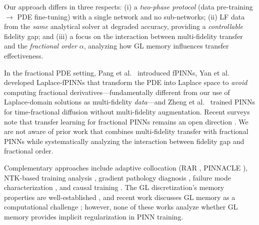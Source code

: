 \documentclass[11pt]{article}
\begin{document}
Our approach differs in three respects: (i) a \emph{two-phase protocol} (data pre-training $\to$ PDE fine-tuning) with a single network and no sub-networks; (ii) LF data from the \emph{same} analytical solver at degraded accuracy, providing a \emph{controllable} fidelity gap; and (iii) a focus on the interaction between multi-fidelity transfer and the \emph{fractional order} $\alpha$, analyzing how GL memory influences transfer effectiveness.

In the fractional PDE setting, Pang et al.\ \cite{pang2019fpinns} introduced fPINNs, Yan et al.\ \cite{yan2023laplace} developed Laplace-fPINNs that transform the PDE into Laplace space to \emph{avoid} computing fractional derivatives---fundamentally different from our use of Laplace-domain solutions as multi-fidelity \emph{data}---and Zheng et al.\ \cite{zheng2021physics} trained PINNs for time-fractional diffusion without multi-fidelity augmentation. Recent surveys note that transfer learning for fractional PINNs remains an open direction \cite{zhao2025fdiff}. We are not aware of prior work that combines multi-fidelity transfer with fractional PINNs while systematically analyzing the interaction between fidelity gap and fractional order.

Complementary approaches include adaptive collocation (RAR \cite{wu2023comprehensive}, PINNACLE \cite{tang2025pinnacle}), NTK-based training analysis \cite{wang2022ntk}, gradient pathology diagnosis \cite{wang2021understanding}, failure mode characterization \cite{krishnapriyan2021characterizing}, and causal training \cite{wang2022respecting}. The GL discretization's memory properties are well-established \cite{podlubny1999fractional,meerschaert2004finite,li2015numerical}, and recent work discusses GL memory as a computational challenge \cite{zhao2025fdiff}; however, none of these works analyze whether GL memory provides implicit regularization in PINN training.
\end{document}
